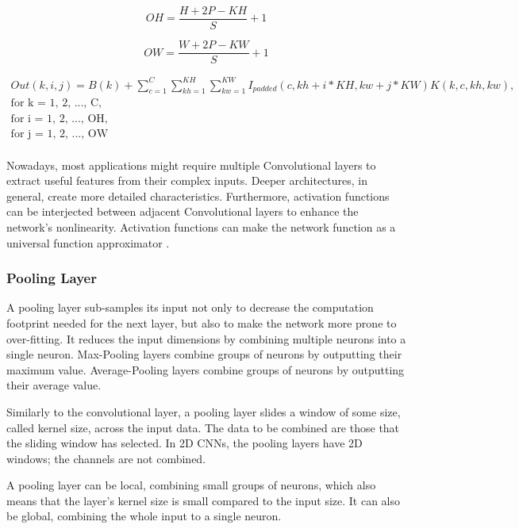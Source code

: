 \begin{equation}
	OH = \frac{H + 2P - KH}{S} + 1
\end{equation}

\begin{equation}
	OW = \frac{W + 2P - KW}{S} + 1
\end{equation}

\begin{equation}
	\label{eqn:convolution}
	\begin{split}
		Out(k, i, j) = B(k) +
		\sum_{c = 1}^{C} \sum_{kh = 1}^{KH} \sum_{kw = 1}^{KW}
		I_{padded}(c, kh + i * KH, kw + j * KW) K(k, c, kh, kw),\\
		\mbox{for k = 1, 2, ..., C},\\
		\mbox{for i = 1, 2, ..., OH},\\
		\mbox{for j = 1, 2, ..., OW}\\
	\end{split}
\end{equation}

Nowadays, most applications might require multiple Convolutional layers to extract useful features from their complex inputs. Deeper architectures, in general, create more detailed characteristics. Furthermore, activation functions can be interjected between adjacent Convolutional layers to enhance the network's nonlinearity. Activation functions can make the network function as a universal function approximator \cite{Approximation-capabilities-of-multilayer-feedforward-networks}.

\subsubsection{Pooling Layer}
A pooling layer sub-samples its input not only to decrease the computation footprint needed for the next layer, but also to make the network more prone to over-fitting. It reduces the input dimensions by combining multiple neurons into a single neuron. Max-Pooling layers combine groups of neurons by outputting their maximum value. Average-Pooling layers combine groups of neurons by outputting their average value.

Similarly to the convolutional layer, a pooling layer slides a window of some size, called kernel size, across the input data. The data to be combined are those that the sliding window has selected. In 2D CNNs, the pooling layers have 2D windows; the channels are not combined.

A pooling layer can be local, combining small groups of neurons, which also means that the layer's kernel size is small compared to the input size. It can also be global, combining the whole input to a single neuron.

